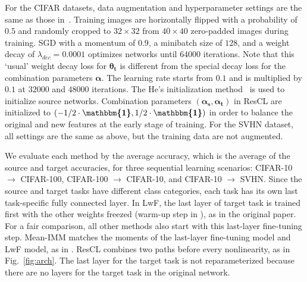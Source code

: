 \documentclass[letterpaper]{article}
\begin{document}
For the CIFAR datasets, data augmentation and hyperparameter settings are the same as those in~\cite{he2016identity}. Training images are horizontally flipped with a probability of $0.5$ and randomly cropped to $32\times32$ from $40\times40$ zero-padded images during training. SGD with a momentum of $0.9$, a minibatch size of $128$, and a weight decay of $\lambda_{dec} = 0.0001$ optimizes networks until $64000$ iterations. Note that this `usual' weight decay loss for $\bm{\theta_t}$ is different from the special decay loss for the combination parameters $\bm{\alpha}$. The learning rate starts from $0.1$ and is multiplied by $0.1$ at $32000$ and $48000$ iterations. The He's initialization method~\cite{he2015delving} is used to initialize source networks. Combination parameters $\left(\bm{\alpha_s}, \bm{\alpha_t}\right)$ in ResCL are initialized to $\left(-1/2\cdot\bm{\mathbbm{1}}, 1/2\cdot\bm{\mathbbm{1}}\right)$ in order to balance the original and new features at the early stage of training. For the SVHN dataset, all settings are the same as above, but the training data are not augmented.





We evaluate each method by the average accuracy, which is the average of the source and target accuracies, for three sequential learning scenarios: CIFAR-10 $\rightarrow$ CIFAR-100, CIFAR-100 $\rightarrow$ CIFAR-10, and CIFAR-10 $\rightarrow$ SVHN. Since the source and target tasks have different class categories, each task has its own last task-specific fully connected layer. In LwF, the last layer of target task is trained first with the other weights freezed (warm-up step in \cite{li2018learning}), as in the original paper. For a fair comparison, all other methods also start with this last-layer fine-tuning step. Mean-IMM matches the moments of the last-layer fine-tuning model and LwF model, as in \cite{lee2017overcoming}. ResCL combines two paths before every nonlinearity, as in Fig.~\ref{fig:arch}. The last layer for the target task is not reparameterized because there are no layers for the target task in the original network.
\end{document}
